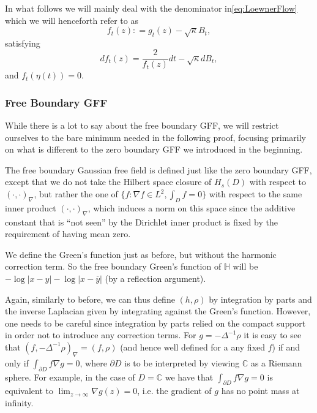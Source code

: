 \documentclass[11pt,reqno]{amsart}
\numberwithin{equation}{section}
\newcommand{\deq}{\mathrel{\mathop:}=}
\begin{document}
In what follows we will mainly deal with the denominator in\eqref{eq:LoewnerFlow} which we will henceforth refer to as $$f_t(z)\deq g_t(z)-\sqrt{\kappa}B_t,$$ satisfying $$df_t(z)=\frac{2}{f_t(z)}dt-\sqrt\kappa dB_t,$$ and $f_t(\eta(t))=0$.


\subsubsection{Free Boundary GFF}
While there is a lot to say about the free boundary GFF, we will restrict ourselves to the bare minimum needed in the following proof, focusing primarily on what is different to the zero boundary GFF we introduced in the beginning.

The free boundary Gaussian free field is defined just like the zero boundary GFF, except that we do not take the Hilbert space closure of $H_s(D)$ with respect to $(\cdot,\cdot)_\nabla$, but rather the one of $\{f:\nabla f\in L^2,\int_D f=0\}$ with respect to the same inner product $(\cdot,\cdot)_\nabla$, which induces a norm on this space since the additive constant that is ``not seen'' by the Dirichlet inner product is fixed by the requirement of having mean zero.

We define the Green's function just as before, but without the harmonic correction term. So the free boundary Green's function of $\mathbb H$ will be $-\log|x-y|-\log|x-\overline y|$ (by a reflection argument).

Again, similarly to before, we can thus define $(h,\rho)$ by integration by parts and the inverse Laplacian given by integrating against the Green's function. However, one needs to be careful since integration by parts relied on the compact support in order not to introduce any correction terms. For $g=-\Delta^{-1}\rho$ it is easy to see that $(f,-\Delta^{-1}\rho)_\nabla=(f,\rho)$ (and hence well defined for a any fixed $f$) if and only if $\int_{\partial D}f\nabla g=0$, where $\partial D$ is to be interpreted by viewing $\mathbb C$ as a Riemann sphere. For example, in the case of $D=\mathbb C$ we have that $\int_{\partial D}f\nabla g=0$ is equivalent to $\lim_{z\rightarrow\infty}\nabla g(z)=0$, i.e. the gradient of $g$ has no point mass at infinity.
\end{document}
